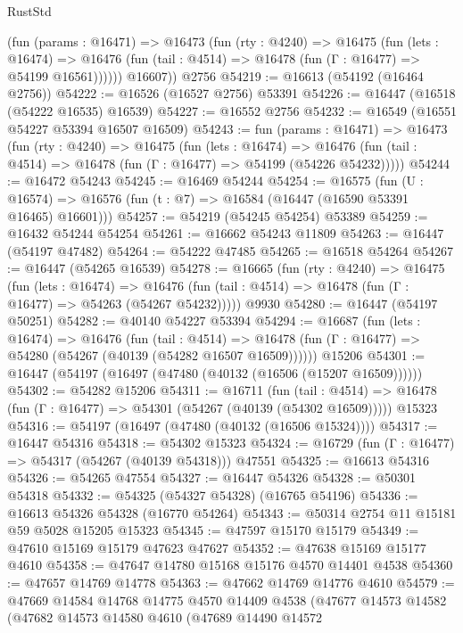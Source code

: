 \begin{lexlean}{RustStd}
\begin{coremodule}
{\begin{coremodule}
{{{{{{{{{{{{{{{{{{{{{{{{{{{{{{{{{{{{{{{{{{{{{{{{{{{{{{{          (fun (params : @16471) =>
          @16473
            (fun (rty : @4240) =>
            @16475
              (fun (lets : @16474) =>
              @16476 (fun (tail : @4514) => @16478 (fun (Γ : @16477) => @54199 @16561))))))
        @16607))
    @2756
@54219 := @16613 (@54192 (@16464 @2756))
@54222 := @16526 (@16527 @2756) @53391
@54226 := @16447 (@16518 (@54222 @16535) @16539)
@54227 := @16552 @2756
@54232 := @16549 (@16551 @54227 @53394 @16507 @16509)
@54243 := fun (params : @16471) =>
  @16473
    (fun (rty : @4240) =>
    @16475
      (fun (lets : @16474) =>
      @16476 (fun (tail : @4514) => @16478 (fun (Γ : @16477) => @54199 (@54226 @54232)))))
@54244 := @16472 @54243
@54245 := @16469 @54244
@54254 := @16575
    (fun (U : @16574) => @16576 (fun (t : @7) => @16584 (@16447 (@16590 @53391 @16465) @16601)))
@54257 := @54219 (@54245 @54254) @53389
@54259 := @16432 @54244 @54254
@54261 := @16662 @54243 @11809
@54263 := @16447 (@54197 @47482)
@54264 := @54222 @47485
@54265 := @16518 @54264
@54267 := @16447 (@54265 @16539)
@54278 := @16665
    (fun (rty : @4240) =>
    @16475
      (fun (lets : @16474) =>
      @16476 (fun (tail : @4514) => @16478 (fun (Γ : @16477) => @54263 (@54267 @54232)))))
    @9930
@54280 := @16447 (@54197 @50251)
@54282 := @40140 @54227 @53394
@54294 := @16687
    (fun (lets : @16474) =>
    @16476
      (fun (tail : @4514) =>
      @16478 (fun (Γ : @16477) => @54280 (@54267 (@40139 (@54282 @16507 @16509))))))
    @15206
@54301 := @16447 (@54197 (@16497 (@47480 (@40132 (@16506 (@15207 @16509))))))
@54302 := @54282 @15206
@54311 := @16711
    (fun (tail : @4514) => @16478 (fun (Γ : @16477) => @54301 (@54267 (@40139 (@54302 @16509)))))
    @15323
@54316 := @54197 (@16497 (@47480 (@40132 (@16506 @15324))))
@54317 := @16447 @54316
@54318 := @54302 @15323
@54324 := @16729 (fun (Γ : @16477) => @54317 (@54267 (@40139 @54318))) @47551
@54325 := @16613 @54316
@54326 := @54265 @47554
@54327 := @16447 @54326
@54328 := @50301 @54318
@54332 := @54325 (@54327 @54328) (@16765 @54196)
@54336 := @16613 @54326 @54328 (@16770 @54264)
@54343 := @50314 @2754 @11 @15181 @59 @5028 @15205 @15323
@54345 := @47597 @15170 @15179
@54349 := @47610 @15169 @15179 @47623 @47627
@54352 := @47638 @15169 @15177 @4610
@54358 := @47647 @14780 @15168 @15176 @4570 @14401 @4538
@54360 := @47657 @14769 @14778
@54363 := @47662 @14769 @14776 @4610
@54579 := @47669
    @14584
    @14768
    @14775
    @4570
    @14409
    @4538
    (@47677
      @14573
      @14582
      (@47682
        @14573
        @14580
        @4610
        (@47689
          @14490
          @14572
}}}}}}}}}}}}}}}}}}}}}}}}}}}}}}}}}}}}}}}}}}}}}}}}}}}}}}}
\end{coremodule}}
\end{coremodule}
\end{lexlean}
